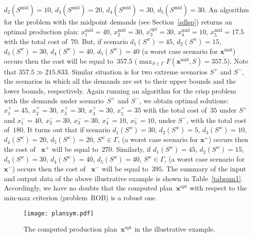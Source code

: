 \documentclass[11pt]{article}
\begin{document}
$d_2(S^{\text{mid}})=10$, $d_3(S^{\text{mid}})=20$, $d_4(S^{\text{mid}})=30$,
 $d_5(S^{\text{mid}})=30$. An algorithm for the problem with 
 the midpoint demands (see Section~\ref{sdlsp}) returns an optimal production
 plan:
 $x^{\text{mid}}_1=40$, $x^{\text{mid}}_2=30$,  $x^{\text{opt}}_3=30$,
$x^{\text{mid}}_4=10$,  $x^{\text{mid}}_5=17.5$ with the total cost of~$70$. But,
if  scenario 
$d_1(S^{w})=45$, 
$d_2(S^{w})=15$, $d_3(S^{w})=30$, $d_4(S^{w})=40$,
 $d_5(S^{w})=40$ (a worst case scenario for $\pmb{x}^{\text{mid}}$) occurs 
 then the cost will be equal to~$357.5$ ($\max_{S\in \Gamma}F(\pmb{x}^{\text{mid}},S)=357.5$).
 Note that $357.5\gg 215.833$.
Similar situation is for two extreme scenarios $S^{+}$ and $S^{-}$,  the scenarios
  in which all the demands are set to their upper bounds and  the lower bounds, respectively.
  Again running an algorithm for the crisp problem with the demands under scenario~$S^{+}$
  and $S^{-}$, we obtain optimal solutions:
   $x^{+}_1=45$, $x^{+}_2=30$,  $x^{+}_3=30$,
$x^{+}_4=30$,  $x^{+}_5=35$ with the total cost of~$35$ under $S^{+}$
and
   $x^{-}_1=40$, $x^{-}_2=30$,  $x^{-}_3=30$,
$x^{-}_4=10$,  $x^{-}_5=10$, under $S^{-}$,
with the total cost of~$180$. It turns out that
if  scenario 
$d_1(S^{w})=30$, 
$d_2(S^{w})=5$, $d_3(S^{w})=10$, $d_4(S^{w})=20$,
 $d_5(S^{w})=20$, $S^w\in\Gamma$, (a worst case scenario for $\pmb{x}^{+}$) occurs
 then  the cost of~ $\pmb{x}^{+}$ will be equal to~$270$. Similarly,
 if 
$d_1(S^{w})=45$, 
$d_2(S^{w})=15$, $d_3(S^{w})=30$, $d_4(S^{w})=40$,
 $d_5(S^{w})=40$, $S^w\in\Gamma$,  (a worst case scenario for $\pmb{x}^{-}$) occurs
 then  the cost of~ $\pmb{x}^{-}$ will be equal to~$395$. 
 The  summary of the input and output data  of the above illustrative example
 is shown in Table~\ref{tabsum1}.
 Accordingly, we have no doubts that
the computed plan~$\pmb{x}^{\text{opt}}$ with respect to the
min-max criterion  (problem~\textsc{ROB}) is a robust one. 
\begin{figure}
\centering
            \texttt{[image: plansym.pdf]}
	\caption{The computed  production plan~$\pmb{x}^{\text{opt}}$ in the
	illustrative example.}\label{fig2}
\end{figure}
\end{document}
